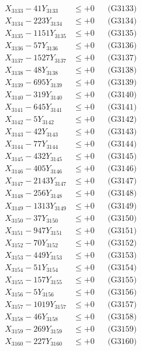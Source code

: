 \documentclass[a4paper,10pt]{article}
\begin{document}
{\begin{align}
X_{3133} - 41Y_{3133} &\leq +0 && \text{(G3133)} \\
X_{3134} - 223Y_{3134} &\leq +0 && \text{(G3134)} \\
X_{3135} - 1151Y_{3135} &\leq +0 && \text{(G3135)} \\
X_{3136} - 57Y_{3136} &\leq +0 && \text{(G3136)} \\
X_{3137} - 1527Y_{3137} &\leq +0 && \text{(G3137)} \\
X_{3138} - 48Y_{3138} &\leq +0 && \text{(G3138)} \\
X_{3139} - 695Y_{3139} &\leq +0 && \text{(G3139)} \\
X_{3140} - 319Y_{3140} &\leq +0 && \text{(G3140)} \\
\allowbreak
X_{3141} - 645Y_{3141} &\leq +0 && \text{(G3141)} \\
X_{3142} - 5Y_{3142} &\leq +0 && \text{(G3142)} \\
X_{3143} - 42Y_{3143} &\leq +0 && \text{(G3143)} \\
X_{3144} - 77Y_{3144} &\leq +0 && \text{(G3144)} \\
X_{3145} - 432Y_{3145} &\leq +0 && \text{(G3145)} \\
X_{3146} - 405Y_{3146} &\leq +0 && \text{(G3146)} \\
X_{3147} - 2143Y_{3147} &\leq +0 && \text{(G3147)} \\
X_{3148} - 256Y_{3148} &\leq +0 && \text{(G3148)} \\
X_{3149} - 1313Y_{3149} &\leq +0 && \text{(G3149)} \\
X_{3150} - 37Y_{3150} &\leq +0 && \text{(G3150)} \\
\allowbreak
X_{3151} - 947Y_{3151} &\leq +0 && \text{(G3151)} \\
X_{3152} - 70Y_{3152} &\leq +0 && \text{(G3152)} \\
X_{3153} - 449Y_{3153} &\leq +0 && \text{(G3153)} \\
X_{3154} - 51Y_{3154} &\leq +0 && \text{(G3154)} \\
X_{3155} - 157Y_{3155} &\leq +0 && \text{(G3155)} \\
X_{3156} - 5Y_{3156} &\leq +0 && \text{(G3156)} \\
X_{3157} - 1019Y_{3157} &\leq +0 && \text{(G3157)} \\
X_{3158} - 46Y_{3158} &\leq +0 && \text{(G3158)} \\
X_{3159} - 269Y_{3159} &\leq +0 && \text{(G3159)} \\
X_{3160} - 227Y_{3160} &\leq +0 && \text{(G3160)} \\

\end{align}}
\end{document}
